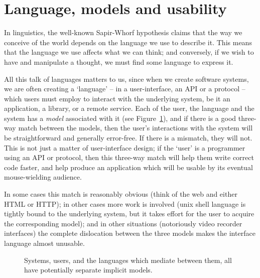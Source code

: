 \documentclass[11pt,twoside]{article}
\begin{document}
\section{Language, models and usability}

In linguistics, the well-known Sapir-Whorf hypothesis claims that the
way we conceive of the world depends on the language we use to
describe it.  This means that the language we use affects what we can
think; and conversely, if we wish to have and manipulate a thought, we
must find some language to express it.

All this talk of languages matters to us, since when we create
software systems, we are often creating a `language' -- in a
user-interface, an API or a protocol -- which users must employ to
interact with the underlying system, be it an application, a library,
or a remote service.  Each of the user, the language and the system
has a \emph{model} associated with it (see Figure~\ref{f:models}), and
if there is a good three-way match between the models,
then the user's interactions with the
system will be straightforward and generally error-free.  If there is
a mismatch, they will not.  This is not just a matter of
user-interface design; if the `user' is a programmer using an
API or protocol, then this three-way match will help them write
correct code faster, and help produce an application which will be
usable by its eventual mouse-wielding audience.

In some cases this match is reasonably obvious (think of the web and
either HTML or HTTP); in other cases more work is involved (unix shell
language is tightly bound to the underlying system, but it takes
effort for the user to acquire the corresponding model); and in other
situations (notoriously video recorder interfaces) the complete
dislocation between the three models makes the interface language
almost unusable.

\begin{figure}
\caption{\label{f:models}Systems, users, and the languages which
mediate between them, all have potentially separate implicit models.}
\end{figure}
\end{document}
